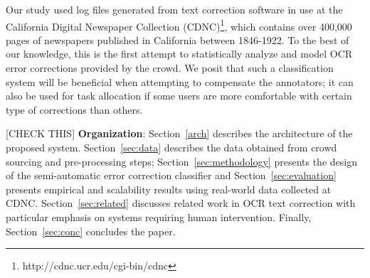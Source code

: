 \documentclass[letterpaper]{article}
\begin{document}
Our study used log files generated from text correction software in use at the California Digital Newspaper Collection (CDNC)\footnote{http://cdnc.ucr.edu/cgi-bin/cdnc}, which contains over 400,000 pages of newspapers published in California between 1846-1922. 
To the best of our knowledge, this is the first attempt to statistically analyze and model OCR error corrections provided by the crowd. We posit that such a classification system will be beneficial when attempting to compensate the annotators; it can also be used for task allocation if some users are more comfortable with certain type of corrections than others.


[CHECK THIS] \noindent \textbf{Organization}: Section~\ref{arch} describes the architecture of the proposed system. Section~\ref{sec:data} describes the data obtained from crowd sourcing and pre-processing steps; Section~\ref{sec:methodology} presents the design of the semi-automatic error correction classifier and Section~\ref{sec:evaluation} presents empirical and scalability results using real-world data collected at CDNC. Section~\ref{sec:related} discusses related work in OCR text correction with particular emphasis on systems requiring human intervention. Finally, Section~\ref{sec:conc} concludes the paper.
\end{document}
